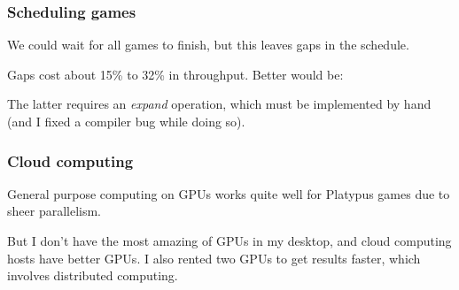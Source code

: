 \documentclass[aspectratio=169]{beamer}
\begin{document}
\begin{frame}
  \frametitle{Scheduling games}

  We could wait for all games to finish, but this leaves gaps in the schedule.
  

  Gaps cost about 15\% to 32\% in throughput. \pause Better would be:
  
  
  The latter requires an \emph{expand} operation, which must be
  implemented by hand (and I fixed a compiler bug while doing so).
\end{frame}

\begin{frame}
  \frametitle{Cloud computing}

  General purpose computing on GPUs works quite well for
  Platypus games due to sheer parallelism.
  
  But I don't have the most amazing of GPUs in my desktop, and
  cloud computing hosts have better GPUs. I also rented two
  GPUs to get results faster, which involves distributed
  computing.
\end{frame}
\end{document}

